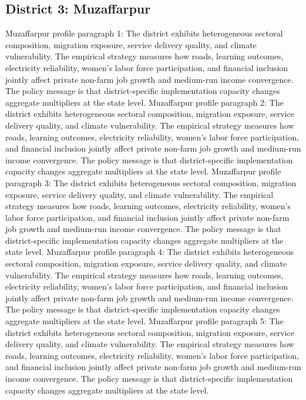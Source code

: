\documentclass[preprint,12pt]{elsarticle}
\begin{document}
\subsection{District 3: Muzaffarpur}
Muzaffarpur profile paragraph 1: The district exhibits heterogeneous sectoral composition, migration exposure, service delivery quality, and climate vulnerability. The empirical strategy measures how roads, learning outcomes, electricity reliability, women's labor force participation, and financial inclusion jointly affect private non-farm job growth and medium-run income convergence. The policy message is that district-specific implementation capacity changes aggregate multipliers at the state level.
Muzaffarpur profile paragraph 2: The district exhibits heterogeneous sectoral composition, migration exposure, service delivery quality, and climate vulnerability. The empirical strategy measures how roads, learning outcomes, electricity reliability, women's labor force participation, and financial inclusion jointly affect private non-farm job growth and medium-run income convergence. The policy message is that district-specific implementation capacity changes aggregate multipliers at the state level.
Muzaffarpur profile paragraph 3: The district exhibits heterogeneous sectoral composition, migration exposure, service delivery quality, and climate vulnerability. The empirical strategy measures how roads, learning outcomes, electricity reliability, women's labor force participation, and financial inclusion jointly affect private non-farm job growth and medium-run income convergence. The policy message is that district-specific implementation capacity changes aggregate multipliers at the state level.
Muzaffarpur profile paragraph 4: The district exhibits heterogeneous sectoral composition, migration exposure, service delivery quality, and climate vulnerability. The empirical strategy measures how roads, learning outcomes, electricity reliability, women's labor force participation, and financial inclusion jointly affect private non-farm job growth and medium-run income convergence. The policy message is that district-specific implementation capacity changes aggregate multipliers at the state level.
Muzaffarpur profile paragraph 5: The district exhibits heterogeneous sectoral composition, migration exposure, service delivery quality, and climate vulnerability. The empirical strategy measures how roads, learning outcomes, electricity reliability, women's labor force participation, and financial inclusion jointly affect private non-farm job growth and medium-run income convergence. The policy message is that district-specific implementation capacity changes aggregate multipliers at the state level.
\end{document}
